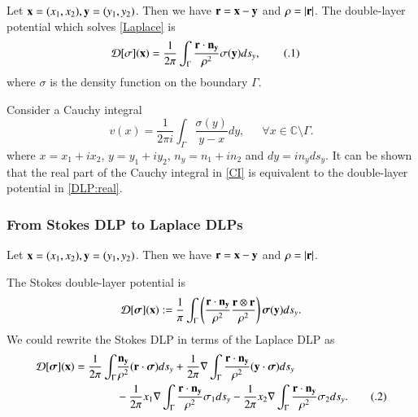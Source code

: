 \documentclass[preprint, 10pt]{elsarticle}
\newcommand{\Cdb}{\mbox{$\mathbb{C}$}}
\newcommand{\D}{\mbox{${\mathcal D}$}}
\newcommand\numberthis{\addtocounter{equation}{1}\tag{\theequation}}
\begin{document}
Let ${\bf x}=(x_1,x_2), {\bf y}=(y_1,y_2)$. Then we have ${\bf r}={\bf x} - {\bf y}$ and $\rho=|\bf r|$.
The double-layer potential which solves \eqref{Laplace} is 
\begin{align*}
\D[\sigma]({\bf x})&=\frac{1}{2\pi}\displaystyle\int_{\Gamma} \frac{{\bf r} \cdot {\bf n_y}}{\rho^2}\sigma({\bf y})ds_y,
\numberthis\label{DLP:real}
\end{align*}
where $\sigma$ is the density function on the boundary $\Gamma$.


Consider a Cauchy integral 
\begin{equation}\label{CI}
v({x})=\frac{1}{2\pi i}\int_{\Gamma}\frac{\sigma({ y})}{{ y}-{ x}} d{ y},\,\,\,\,\,\,\,\,\, \forall { x} \in \Cdb\setminus \Gamma.
\end{equation}
where ${ x}=x_1+ix_2$, $ { y}=y_1+iy_2$, ${ n_y}=n_1+i n_2$ and $d{ y}=i {n_y}ds_y$. It can be shown that 
the real part of the Cauchy integral in \eqref{CI} is equivalent to the double-layer potential in \eqref{DLP:real}. 


\subsubsection{From Stokes DLP to Laplace DLPs}

Let ${\bf x}=(x_1,x_2), {\bf y}=(y_1,y_2)$. Then we have ${\bf r}={\bf x} - {\bf y}$ and $\rho=|\bf r|$.


The Stokes double-layer potential  is
\begin{equation}\label{StokesDLP1}
\D[\boldsymbol\sigma]({\bf x}):=\frac{1}{\pi}\int_{\Gamma}\left(\frac{{\bf r} \cdot {\bf n_y}}{\rho^2}\frac{{\bf r} \otimes {\bf r}}{\rho^2}\right) {\boldsymbol\sigma({\bf y})} d s_y.
\end{equation}
We could rewrite the Stokes DLP in terms of the Laplace DLP as
\begin{align*}\label{StokesDLP2}
\D[\boldsymbol\sigma]({\bf x})=\frac{1}{2\pi}\int_{\Gamma}&\frac{{\bf n_y}}{\rho^2}({\bf r} \cdot {\boldsymbol \sigma})ds_y+\frac{1}{2\pi}\nabla\int_{\Gamma}\frac{{\bf r} \cdot {\bf n_y}}{\rho^2}({\bf y} \cdot{\boldsymbol \sigma})ds_y\\
&-\frac{1}{2\pi}x_1 \nabla\int_{\Gamma}\frac{{\bf r} \cdot {\bf n_y}}{\rho^2}\sigma_1ds_y-\frac{1}{2\pi}x_2\nabla\int_{\Gamma}\frac{{\bf r} \cdot {\bf n_y}}{\rho^2}\sigma_2ds_y. \numberthis
\end{align*}
\end{document}
